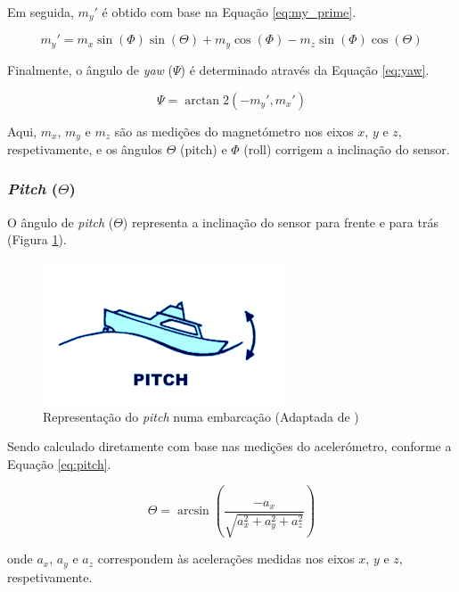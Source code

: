 Em seguida, \(m_y'\) é obtido com base na Equação \ref{eq:my_prime}.

\begin{equation}
    m_y' = m_x \sin(\Phi) \sin(\Theta) + m_y \cos(\Phi) - m_z \sin(\Phi) \cos(\Theta)
    \label{eq:my_prime}
\end{equation}

Finalmente, o ângulo de \emph{yaw} (\(\Psi\)) é determinado através da Equação \ref{eq:yaw}. 

\begin{equation}
    \Psi = \arctan2(-m_y', m_x')
    \label{eq:yaw}
\end{equation}

Aqui, \(m_x\), \(m_y\) e \(m_z\) são as medições do magnetómetro nos eixos \(x\), \(y\) e \(z\), respetivamente, e os ângulos \(\Theta\) (pitch) e \(\Phi\) (roll) corrigem a inclinação do sensor.

\subsubsection{\emph{Pitch} (\(\Theta\))}
O ângulo de  \emph{pitch} (\(\Theta\)) representa a inclinação do sensor para frente e para trás (Figura \ref{fig:pitch}).

\begin{figure}[H]
    \centering
    \includegraphics[height=0.2\linewidth]{figuras/Pitch.png}
    \caption[Representação do \emph{pitch} numa embarcação]{Representação do \emph{pitch} numa embarcação (Adaptada de \cite{imagem-yaw-pitch-roll})}
    \label{fig:pitch}
\end{figure}

Sendo calculado diretamente com base nas medições do acelerómetro, conforme a Equação \ref{eq:pitch}.

\begin{equation}
    \Theta = \arcsin{\left(\frac{-a_x}{\sqrt{a_x^2 + a_y^2 + a_z^2}}\right)}
    \label{eq:pitch}
\end{equation}

onde \(a_x\), \(a_y\) e \(a_z\) correspondem às acelerações medidas nos eixos \(x\), \(y\) e \(z\), respetivamente.

